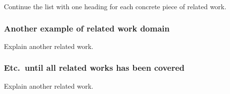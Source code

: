 Continue the list with one heading for each concrete piece of related work.

\subsubsection{Another example of related work domain}\label{subsubsec:anotherexample}
Explain another related work.

\subsubsection{Etc.\ until all related works has been covered}\label{subsubsec:etc}
Explain another related work.

